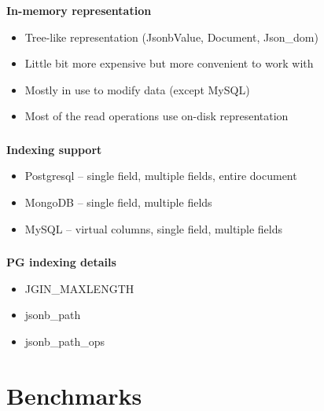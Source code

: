 \documentclass[usenames,dvipsnames, 18pt, compress, aspectratio=169]{beamer}
\begin{document}
\begin{frame}
    \frametitle{}
    \textbf{In-memory representation}
    \begin{center}
        \begin{itemize}[label={\MVRightarrow}]
            \item Tree-like representation (JsonbValue, Document, Json\_dom)
            \item Little bit more expensive but more convenient to work with
            \item Mostly in use to modify data (except MySQL)
            \item Most of the read operations use on-disk representation
        \end{itemize}
    \end{center}
\end{frame}

\begin{frame}
    \frametitle{}
    \textbf{Indexing support}
    \begin{center}
        \begin{itemize}[label={\MVRightarrow}]
            \item Postgresql -- single field, multiple fields, entire document
            \item MongoDB -- single field, multiple fields
            \item MySQL -- virtual columns, single field, multiple fields
        \end{itemize}
    \end{center}
\end{frame}

\begin{frame}
    \frametitle{}
    \textbf{PG indexing details}
    \begin{center}
        \begin{itemize}[label={\MVRightarrow}]
            \item JGIN\_MAXLENGTH
            \item jsonb\_path
            \item jsonb\_path\_ops
        \end{itemize}
    \end{center}
\end{frame}

\fontsize{13pt}{14}\selectfont
\section{Benchmarks}
\fontsize{17pt}{18}\selectfont
\end{document}
